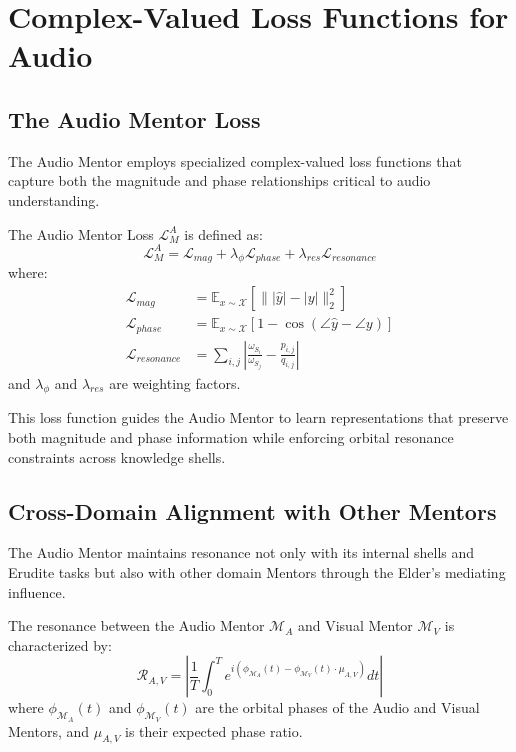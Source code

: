 \section{Complex-Valued Loss Functions for Audio}

\subsection{The Audio Mentor Loss}

The Audio Mentor employs specialized complex-valued loss functions that capture both the magnitude and phase relationships critical to audio understanding.

\begin{definition}
The Audio Mentor Loss $\mathcal{L}_M^A$ is defined as:
\begin{equation}
\mathcal{L}_M^A = \mathcal{L}_{mag} + \lambda_{\phi} \mathcal{L}_{phase} + \lambda_{res} \mathcal{L}_{resonance}
\end{equation}
where:
\begin{align}
\mathcal{L}_{mag} &= \mathbb{E}_{x \sim \mathcal{X}} \left[ \| |\hat{y}| - |y| \|_2^2 \right] \\
\mathcal{L}_{phase} &= \mathbb{E}_{x \sim \mathcal{X}} \left[ 1 - \cos(\angle\hat{y} - \angle y) \right] \\
\mathcal{L}_{resonance} &= \sum_{i,j} \left| \frac{\omega_{S_i}}{\omega_{S_j}} - \frac{p_{i,j}}{q_{i,j}} \right|
\end{align}
and $\lambda_{\phi}$ and $\lambda_{res}$ are weighting factors.
\end{definition}

This loss function guides the Audio Mentor to learn representations that preserve both magnitude and phase information while enforcing orbital resonance constraints across knowledge shells.

\subsection{Cross-Domain Alignment with Other Mentors}

The Audio Mentor maintains resonance not only with its internal shells and Erudite tasks but also with other domain Mentors through the Elder's mediating influence.

\begin{definition}
The resonance between the Audio Mentor $\mathcal{M}_A$ and Visual Mentor $\mathcal{M}_V$ is characterized by:
\begin{equation}
\mathcal{R}_{A,V} = \left| \frac{1}{T} \int_0^T e^{i(\phi_{\mathcal{M}_A}(t) - \phi_{\mathcal{M}_V}(t) \cdot \mu_{A,V})} dt \right|
\end{equation}
where $\phi_{\mathcal{M}_A}(t)$ and $\phi_{\mathcal{M}_V}(t)$ are the orbital phases of the Audio and Visual Mentors, and $\mu_{A,V}$ is their expected phase ratio.
\end{definition}

